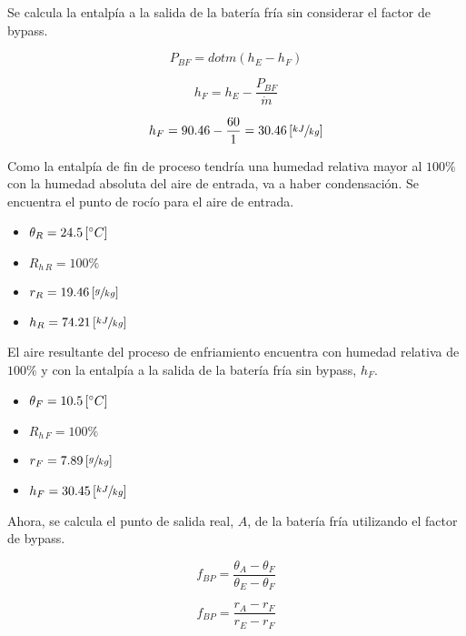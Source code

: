 \documentclass[11pt]{article}
\begin{document}
Se calcula la entalpía a la salida de la batería fría sin considerar el factor de bypass.

\[ P_{ BF } = dot{ m } \left( h_E - h_F \right) \]

\[ h_F = h_E - \frac{ P_{ BF } }{ \dot{ m } } \]

\[ h_F = 90.46 - \frac{ 60 }{ 1 } = 30.46 \left[ \sfrac{ kJ }{ kg } \right] \]

Como la entalpía de fin de proceso tendría una humedad relativa mayor al $ 100\% $ con la humedad absoluta del aire de entrada, va a haber condensación. Se encuentra el punto de rocío para el aire de entrada.

\begin{itemize}
    \item
    $ \theta _R = 24.5 \left[ \degree C \right] $

    \item
    $ R_{ h \, R } = 100\% $

    \item
    $ r_R = 19.46 \left[ \sfrac{ g }{ kg } \right] $

    \item
    $ h_R = 74.21 \left[ \sfrac{ kJ }{ kg } \right] $

\end{itemize}

El aire resultante del proceso de enfriamiento encuentra con humedad relativa de  $ 100\% $ y con la entalpía a la salida de la batería fría sin bypass, $ h_F $.

\begin{itemize}
    \item
    $ \theta _F = 10.5 \left[ \degree C \right] $

    \item
    $ R_{ h \, F } = 100\% $

    \item
    $ r_F = 7.89 \left[ \sfrac{ g }{ kg } \right] $

    \item
    $ h_F = 30.45 \left[ \sfrac{ kJ }{ kg } \right] $

\end{itemize}

Ahora, se calcula el punto de salida real, $ A $, de la batería fría utilizando el factor de bypass.

\[ f_{ BP } = \frac{ \theta _A - \theta _F }{ \theta _E - \theta _F } \]

\[ f_{ BP } = \frac{ r_A - r_F }{ r_E - r_F } \]
\end{document}
